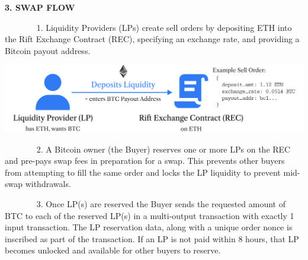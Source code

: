 \documentclass[
]{article}
\begin{document}
\begin{center}
\textbf{3. SWAP FLOW}
\end{center}
{}\vspace*{\baselineskip}

{~ ~ ~ ~ ~1. Liquidity Providers (LPs) create sell orders by depositing ETH into
  the Rift Exchange Contract (REC), specifying an exchange rate, and providing a Bitcoin payout
address.}



{}
{}\vspace*{\baselineskip}
\begin{center}
{\includegraphics{images/image5.png}}
\end{center}
{}\vspace*{\baselineskip}

{}

{}

{~ ~ ~ ~ ~2. A Bitcoin owner (the Buyer) reserves one or more LPs on the REC and
  pre-pays swap fees in preparation for a swap. This prevents other buyers from attempting to
fill the same order and locks the LP liquidity to prevent mid-swap
withdrawals.}

{}

{}
{}\vspace*{\baselineskip}
\begin{center}
\end{center}
{}\vspace*{\baselineskip}

{}

{}

{~ ~ ~ ~ ~3. Once LP(s) are reserved the Buyer sends the requested amount of BTC
  to each of the reserved LP(s) in a multi-output transaction with exactly 1 input transaction. The LP
reservation data, along with a unique order nonce is inscribed as part
of the transaction. If an LP is not paid within 8 hours, that LP becomes
unlocked and available for other buyers to reserve.}
\end{document}
